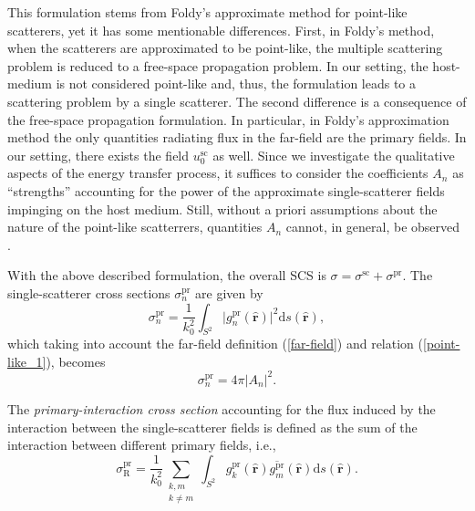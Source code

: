 \documentclass{article}
\begin{document}
This formulation stems from Foldy's approximate method \cite{Foldy} for point-like scatterers, yet it has some mentionable differences. First, in Foldy's method, when the scatterers are approximated to be point-like, the multiple scattering problem is reduced to a free-space propagation problem. In our setting, the host-medium is not considered point-like and, thus, the formulation leads to a scattering problem by a single scatterer. The second difference is a consequence of the free-space propagation formulation. In particular, in Foldy's approximation method the only quantities radiating flux in the far-field are the primary fields. In our setting, there exists the field $u_0^{\mathrm{sc}}$ as well. Since we investigate the qualitative aspects of the energy transfer process, it suffices to consider the coefficients $A_n$ as ``strengths'' accounting for the power of the approximate single-scatterer fields impinging on the host medium. %
Still, without a priori assumptions about the nature of the point-like scatterrers, quantities $A_n$ cannot, in general, be observed \cite{Martin, Twersky2}.

With the above described formulation, the overall SCS is $\sigma=\sigma^{\mathrm{sc}}+\sigma^{\mathrm{pr}}$. The single-scatterer cross sections $\sigma_n^{\mathrm{pr}}$ are given by
%
\begin{equation}
\label{point-like_6}
    \sigma_n^{\mathrm{pr}}=\frac{1}{k_0^2}\int_{S^2}\lvert g_n^{\mathrm{pr}}(\hat{\mathbf{r}})\rvert^2\mathrm{d}s(\hat{\mathbf{r}}),
\end{equation}
%
which taking into account the far-field definition (\ref{far-field}) and relation (\ref{point-like_1}), becomes
%
\begin{equation}
\label{point-like_7}
    \sigma_n^{\mathrm{pr}}=4\pi\lvert A_n\rvert^2.
\end{equation}
%

The \emph{primary-interaction cross section} accounting for the flux induced by the interaction between the single-scatterer fields is defined as the sum of the interaction between different primary fields, i.e.,
%
\begin{equation}
    \label{point-like_8}
    \sigma_{\mathrm{R}}^{\mathrm{pr}}=\frac{1}{k_0^2}\sum_{\substack{k,m\\k\ne m}}\int_{S^2}g_k^{\mathrm{pr}}(\hat{\mathbf{r}})\overline{g_m^{\mathrm{pr}}}(\hat{\mathbf{r}})\mathrm{d}s(\hat{\mathbf{r}}).
\end{equation}
%
\end{document}
